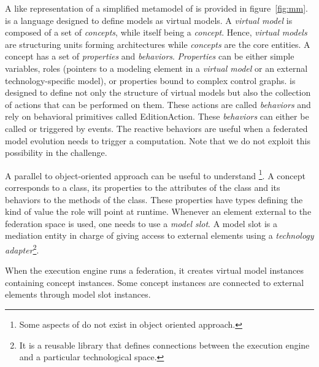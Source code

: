 A \UML like representation of a simplified metamodel of \FML is provided in figure~\ref{fig:mm}. \FML is a language designed to define models as virtual models. A \emph{virtual model} is composed of a set of \emph{concepts}, while itself being a \emph{concept}. Hence, \emph{virtual models} are structuring units forming architectures while \emph{concepts} are the core entities. A concept has a set of \emph{properties} and \emph{behaviors}. \emph{Properties} can be either simple variables, roles (pointers to a modeling element in a \emph{virtual model} or an external technology-specific model), or properties bound to complex control graphs. \FML is designed to define not only the structure of virtual models but also the collection of actions that can be performed on them. These actions are called \emph{behaviors} and rely on behavioral primitives called \textsf{EditionAction}. These \emph{behaviors} can either be called or triggered by events. The reactive behaviors are useful when a federated model evolution needs to trigger a computation. Note that we do not exploit this possibility in the challenge.

A parallel to object-oriented approach can be useful to understand \FML\footnote{Some aspects of \FML do not exist in object oriented approach.}. A concept corresponds to a class, its properties to the attributes of the class and its behaviors to the methods of the class. These properties have types defining the kind of value the role will point at runtime. Whenever an element external to the federation space is used, one needs to use a \emph{model slot}. A model slot is a mediation entity in charge of giving access to external elements using a \emph{technology adapter}\footnote{It is a reusable library that defines connections between the \FML execution engine and a particular technological space.}.

When the \FML execution engine runs a federation, it creates virtual
model instances containing concept instances. Some concept instances
are connected to external elements through model slot instances.



